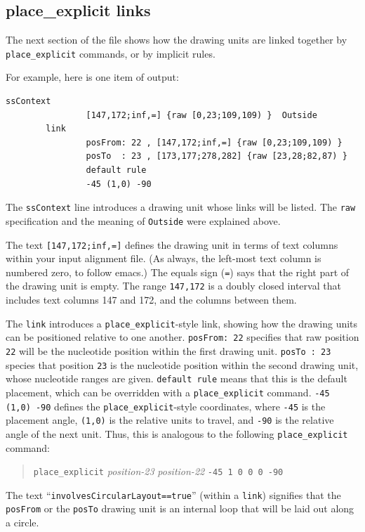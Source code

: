 \documentclass[letterpaper,12pt]{report}
\newcommand{\example}[1]{
\begin{quote}
{\raggedright
#1
}
\end{quote}
}
\begin{document}
\subsection{place\_explicit links}

The next section of the file shows how the drawing units are linked together by {\tt place\_explicit} commands, or
by implicit rules.

For example, here is one item of output:
\begin{verbatim}
ssContext
                [147,172;inf,=] {raw [0,23;109,109) }  Outside
        link
                posFrom: 22 , [147,172;inf,=] {raw [0,23;109,109) }
                posTo  : 23 , [173,177;278,282] {raw [23,28;82,87) }
                default rule
                -45 (1,0) -90
\end{verbatim}

The {\tt ssContext} line introduces a drawing unit whose links will be listed.
The {\tt raw} specification and the meaning of {\tt Outside} were explained above.

The text {\tt [147,172;inf,=]} defines the drawing unit in terms of text columns within your
input alignment file.  (As always, the left-most text column is numbered zero, to follow emacs.)
The equals sign ({\tt =}) says that the right part of the drawing unit is empty.
The range {\tt 147,172} is a doubly closed interval that includes text columns 147 and 172, and
the columns between them.

The {\tt link} introduces a {\tt place\_explicit}-style link, showing how the drawing units
can be positioned relative to one another.
{\tt posFrom: 22} specifies that raw position {\tt 22} will be the nucleotide position within
the first drawing unit.
{\tt posTo  : 23} species that position {\tt 23} is the nucleotide position within the second
drawing unit, whose nucleotide ranges are given.
{\tt default rule} means that this is the default placement, which can be overridden with a
{\tt place\_explicit} command.
{\tt -45 (1,0) -90} defines the {\tt place\_explicit}-style coordinates,
where {\tt -45} is the placement angle, {\tt (1,0)} is the relative units to travel,
and {\tt -90} is the relative angle of the next unit.
Thus, this is analogous to the following {\tt place\_explicit} command:
\example{
{\tt place\_explicit} {\it position-23} {\it position-22} {\tt -45 1 0 0 0 -90}
}

The text ``{\tt involvesCircularLayout==true}'' (within a {\tt link}) signifies that the
{\tt posFrom} or the {\tt posTo} drawing unit is an internal loop that will be laid out
along a circle.
\end{document}
